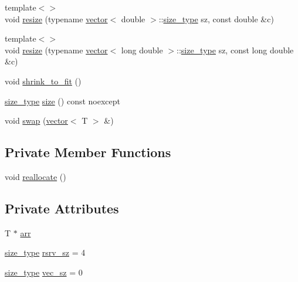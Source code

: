 \begin{DoxyCompactItemize}
\item 
{\footnotesize template$<$$>$ }\\void \mbox{\hyperlink{classvector_a3bb8f47513f801f32b2cfa5257f38eac}{resize}} (typename \mbox{\hyperlink{classvector}{vector}}$<$ double $>$\+::\mbox{\hyperlink{classvector_ada51e68d31936547d3729c82daf6b7c6}{size\+\_\+type}} sz, const double \&c)
\item 
{\footnotesize template$<$$>$ }\\void \mbox{\hyperlink{classvector_a0c6e21bc9719a16aced0e96ac5580e74}{resize}} (typename \mbox{\hyperlink{classvector}{vector}}$<$ long double $>$\+::\mbox{\hyperlink{classvector_ada51e68d31936547d3729c82daf6b7c6}{size\+\_\+type}} sz, const long double \&c)
\item 
void \mbox{\hyperlink{classvector_a5f16304f80b6fb253c7b0ead3e16dd18}{shrink\+\_\+to\+\_\+fit}} ()
\item 
\mbox{\hyperlink{classvector_ada51e68d31936547d3729c82daf6b7c6}{size\+\_\+type}} \mbox{\hyperlink{classvector_abec25c66aa9cfd72297435fd47e3dac1}{size}} () const noexcept
\item 
void \mbox{\hyperlink{classvector_a4ee8c32c194e2497afcc60775cab3169}{swap}} (\mbox{\hyperlink{classvector}{vector}}$<$ T $>$ \&)
\end{DoxyCompactItemize}
\subsection*{Private Member Functions}
\begin{DoxyCompactItemize}
\item 
void \mbox{\hyperlink{classvector_aa5cad3f031015371cc0bf94aa6a2e5c5}{reallocate}} ()
\end{DoxyCompactItemize}
\subsection*{Private Attributes}
\begin{DoxyCompactItemize}
\item 
T $\ast$ \mbox{\hyperlink{classvector_a146e9e7358f9c0ad7b78c73519623f6c}{arr}}
\item 
\mbox{\hyperlink{classvector_ada51e68d31936547d3729c82daf6b7c6}{size\+\_\+type}} \mbox{\hyperlink{classvector_a6ba18857633bab5d161c8b61c262e1e7}{rsrv\+\_\+sz}} = 4
\item 
\mbox{\hyperlink{classvector_ada51e68d31936547d3729c82daf6b7c6}{size\+\_\+type}} \mbox{\hyperlink{classvector_a0a11a0cb28b68616a2ce296acdfce192}{vec\+\_\+sz}} = 0
\end{DoxyCompactItemize}


